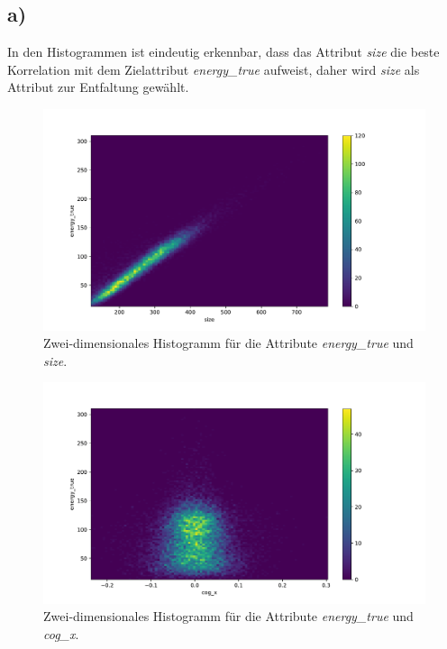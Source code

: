 \documentclass[a4paper, 11pt]{article}
\begin{document}
\subsection*{a)}
In den Histogrammen ist eindeutig erkennbar, dass das Attribut \textit{size} die beste Korrelation mit dem Zielattribut \textit{energy\_true} aufweist, daher wird \textit{size} als Attribut zur Entfaltung gewählt.
\begin{figure}[H]
    \centering
    \includegraphics[width=\textwidth]{../A38/A37a_size.pdf}
    \caption{Zwei-dimensionales Histogramm für die Attribute \textit{energy\_true} und \textit{size}.}
    \label{fig:hist_size}
\end{figure}
\begin{figure}[H]
    \centering
    \includegraphics[width=\textwidth]{../A38/A37a_cog_x.pdf}
    \caption{Zwei-dimensionales Histogramm für die Attribute \textit{energy\_true} und \textit{cog\_x}.}
    \label{fig:hist_cog_x)}
\end{figure}
\end{document}

